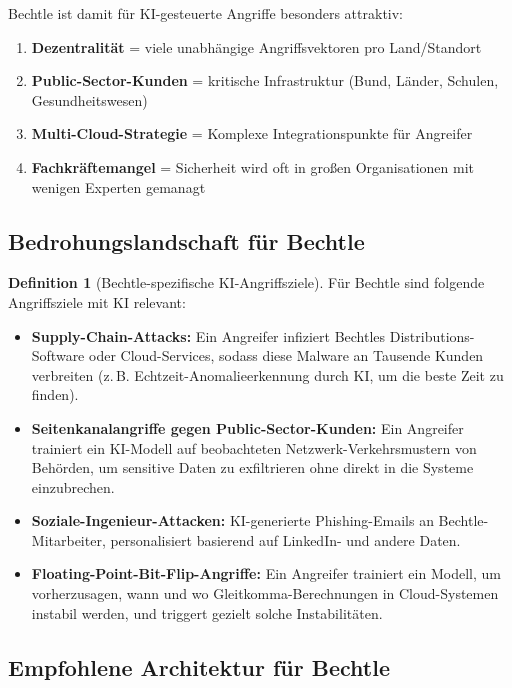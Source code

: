 \documentclass[a4paper,12pt]{article}
\theoremstyle{definition}
\newtheorem{definition}{Definition}
\begin{document}
Bechtle ist damit für KI-gesteuerte Angriffe besonders attraktiv:
\begin{enumerate}
	\item \textbf{Dezentralität} = viele unabhängige Angriffsvektoren pro Land/Standort
	\item \textbf{Public-Sector-Kunden} = kritische Infrastruktur (Bund, Länder, Schulen, Gesundheitswesen)
	\item \textbf{Multi-Cloud-Strategie} = Komplexe Integrationspunkte für Angreifer
	\item \textbf{Fachkräftemangel} = Sicherheit wird oft in großen Organisationen mit wenigen Experten gemanagt
\end{enumerate}

\subsection{Bedrohungslandschaft für Bechtle}

\begin{definition}[Bechtle-spezifische KI-Angriffsziele]
Für Bechtle sind folgende Angriffsziele mit KI relevant:
\begin{itemize}
	\item \textbf{Supply-Chain-Attacks:} Ein Angreifer infiziert Bechtles Distributions-Software oder Cloud-Services, sodass diese Malware an Tausende Kunden verbreiten (z.\,B. Echtzeit-Anomalieerkennung durch KI, um die beste Zeit zu finden).
	\item \textbf{Seitenkanalangriffe gegen Public-Sector-Kunden:} Ein Angreifer trainiert ein KI-Modell auf beobachteten Netzwerk-Verkehrsmustern von Behörden, um sensitive Daten zu exfiltrieren ohne direkt in die Systeme einzubrechen.
	\item \textbf{Soziale-Ingenieur-Attacken:} KI-generierte Phishing-Emails an Bechtle-Mitarbeiter, personalisiert basierend auf LinkedIn- und andere Daten.
	\item \textbf{Floating-Point-Bit-Flip-Angriffe:} Ein Angreifer trainiert ein Modell, um vorherzusagen, wann und wo Gleitkomma-Berechnungen in Cloud-Systemen instabil werden, und triggert gezielt solche Instabilitäten.
\end{itemize}
\end{definition}

\subsection{Empfohlene Architektur für Bechtle}
\end{document}
